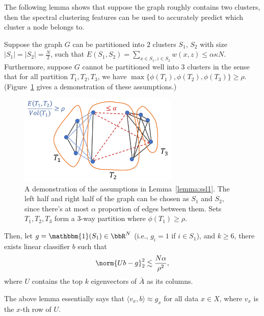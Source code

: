 The following lemma shows that suppose the graph roughly contains two clusters, then the spectral clustering features can be used to accurately predict which cluster a node belongs to.
\begin{lemma}\label{lemma:ssl1}
	Suppose the graph $G$ can be partitioned into $2$ clusters $S_1$, $S_2$ with size $|S_1| = |S_2| = \frac{N}{2}$, such that $E(S_1, S_2)=\sum_{x\in S_1, z\in S_2} w(x, z) \le \alpha \kappa N$. Furthermore, suppose $G$ cannot be partitioned well into $3$ clusters in the sense that for all partition $ T_1, T_2, T_3$, we have $\max\{\phi(T_1), \phi(T_2), \phi(T_3)\} \ge \rho$. (Figure~\ref{figure:ssl_thm_assumption} gives a demonstration of these assumptions.)
	\begin{figure}[ht]
		\centering
		\includegraphics[width=3in]{figures/ssl4.pdf}
		\caption{A demonstration of the assumptions in Lemma~\ref{lemma:ssl1}. The left half and right half of the graph can be chosen as $S_1$ and $S_2$, since there's at most $\alpha$ proportion of edges between them. Sets $T_1, T_2, T_3$ form a 3-way partition where $\phi(T_1)\ge \rho$.
		}\label{figure:ssl_thm_assumption}
	\end{figure}
	Then, let $g=\mathbbm{1}(S_1)\in \bbR^N$ (i.e., $g_i=1$ if $i\in S_1$), and $k\ge 6$, there exists linear classifier $b$ such that %
	\begin{align}
		\norm{Ub-g}_2^2 \lesssim \frac{N\alpha}{\rho^2},
	\end{align}
where $U$ contains the top $k$ eigenvectors of $\bar{A}$ as its columns.
\end{lemma}

The above lemma essentially says that $\langle v_x, b \rangle\approx g_x$ for all data $x\in X$, where $v_x$ is the $x$-th row of $U$. 

